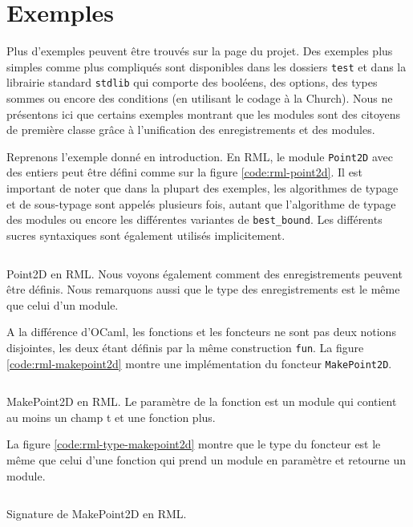 \section{Exemples}

Plus d'exemples peuvent être trouvés sur la page du projet. Des exemples plus
simples comme plus compliqués sont disponibles dans les dossiers \verb|test| et
dans la librairie standard \verb|stdlib| qui comporte des booléens, des options,
des types sommes ou encore des conditions (en utilisant le codage à la Church).
Nous ne présentons ici que certains exemples montrant que les modules sont des
citoyens de première classe grâce à l'unification des enregistrements et des modules.

Reprenons l'exemple donné en introduction. En RML, le module \verb|Point2D| avec
des entiers peut être défini comme sur la figure
\ref{code:rml-point2d}. Il est important de noter que dans la plupart des
exemples, les algorithmes de typage et de sous-typage sont appelés plusieurs
fois, autant que l'algorithme de typage des modules ou encore les différentes variantes
de \verb|best_bound|. Les différents sucres syntaxiques sont également utilisés
implicitement.

\begin{listing}
  \inputminted{OCaml}{codes/point2d.rml}
  \caption{Point2D en RML. Nous voyons également comment des enregistrements
    peuvent être définis. Nous remarquons aussi que le type des enregistrements
    est le même que celui d'un module.
  }
  \label{code:rml-point2d}
\end{listing}

A la différence d'OCaml, les fonctions et les foncteurs ne sont pas deux notions
disjointes, les deux étant définis par la même construction \verb|fun|. La
figure \ref{code:rml-makepoint2d} montre une implémentation du foncteur
\verb|MakePoint2D|.

\begin{listing}
  \inputminted{OCaml}{codes/makepoint2d.rml}
  \caption{MakePoint2D en RML. Le paramètre de la fonction est un module qui
    contient au moins un champ t et une fonction plus.}
  \label{code:rml-makepoint2d}
\end{listing}

La figure \ref{code:rml-type-makepoint2d} montre que le type du foncteur est le même
que celui d'une fonction qui prend un module en paramètre et retourne un module.

\begin{listing}
  \inputminted{OCaml}{codes/makepoint2d_sig.rml}
  \caption{Signature de MakePoint2D en RML.}
  \label{code:rml-type-makepoint2d}
\end{listing}

